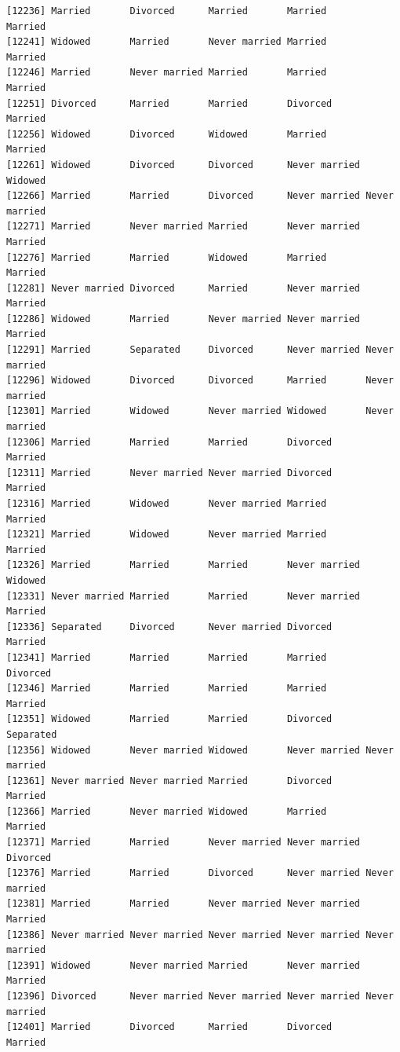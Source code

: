 \documentclass[
  letterpaper,
  DIV=11,
  numbers=noendperiod,
  oneside]{scrartcl}
\begin{document}
\begin{verbatim}
[12236] Married       Divorced      Married       Married       Married      
[12241] Widowed       Married       Never married Married       Married      
[12246] Married       Never married Married       Married       Married      
[12251] Divorced      Married       Married       Divorced      Married      
[12256] Widowed       Divorced      Widowed       Married       Married      
[12261] Widowed       Divorced      Divorced      Never married Widowed      
[12266] Married       Married       Divorced      Never married Never married
[12271] Married       Never married Married       Never married Married      
[12276] Married       Married       Widowed       Married       Married      
[12281] Never married Divorced      Married       Never married Married      
[12286] Widowed       Married       Never married Never married Married      
[12291] Married       Separated     Divorced      Never married Never married
[12296] Widowed       Divorced      Divorced      Married       Never married
[12301] Married       Widowed       Never married Widowed       Never married
[12306] Married       Married       Married       Divorced      Married      
[12311] Married       Never married Never married Divorced      Married      
[12316] Married       Widowed       Never married Married       Married      
[12321] Married       Widowed       Never married Married       Married      
[12326] Married       Married       Married       Never married Widowed      
[12331] Never married Married       Married       Never married Married      
[12336] Separated     Divorced      Never married Divorced      Married      
[12341] Married       Married       Married       Married       Divorced     
[12346] Married       Married       Married       Married       Married      
[12351] Widowed       Married       Married       Divorced      Separated    
[12356] Widowed       Never married Widowed       Never married Never married
[12361] Never married Never married Married       Divorced      Married      
[12366] Married       Never married Widowed       Married       Married      
[12371] Married       Married       Never married Never married Divorced     
[12376] Married       Married       Divorced      Never married Never married
[12381] Married       Married       Never married Never married Married      
[12386] Never married Never married Never married Never married Never married
[12391] Widowed       Never married Married       Never married Married      
[12396] Divorced      Never married Never married Never married Never married
[12401] Married       Divorced      Married       Divorced      Married      

\end{verbatim}
\end{document}
